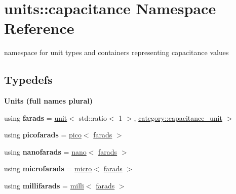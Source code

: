 \hypertarget{namespaceunits_1_1capacitance}{}\section{units\+:\+:capacitance Namespace Reference}
\label{namespaceunits_1_1capacitance}


namespace for unit types and containers representing capacitance values  


\subsection*{Typedefs}
\begin{Indent}{\bf Units (full names plural)}\par
\begin{DoxyCompactItemize}
\item 
\hypertarget{namespaceunits_1_1capacitance_a5c527231d50a09911cca9e4797a642af}{}using {\bfseries farads} = \hyperlink{structunits_1_1unit}{unit}$<$ std\+::ratio$<$ 1 $>$, \hyperlink{namespaceunits_1_1category_a0485a4663b435d78582744b8b83ea3c2}{category\+::capacitance\+\_\+unit} $>$\label{namespaceunits_1_1capacitance_a5c527231d50a09911cca9e4797a642af}

\item 
\hypertarget{namespaceunits_1_1capacitance_aaeced7bfd0603e91e079bd052c66b455}{}using {\bfseries picofarads} = \hyperlink{group___unit_manipulators_ga82a8d14a3e0877a375a66b64c45baab9}{pico}$<$ \hyperlink{structunits_1_1unit}{farads} $>$\label{namespaceunits_1_1capacitance_aaeced7bfd0603e91e079bd052c66b455}

\item 
\hypertarget{namespaceunits_1_1capacitance_a481db0caa9cef79932f1ca251a6f610b}{}using {\bfseries nanofarads} = \hyperlink{group___unit_manipulators_ga1c25c3c1d6c1f3aed3fd1ecf043110d5}{nano}$<$ \hyperlink{structunits_1_1unit}{farads} $>$\label{namespaceunits_1_1capacitance_a481db0caa9cef79932f1ca251a6f610b}

\item 
\hypertarget{namespaceunits_1_1capacitance_ab72ef2d1eda78ca33fed7c11a528b303}{}using {\bfseries microfarads} = \hyperlink{group___unit_manipulators_gaea53c906ec805110b93f02db4a961971}{micro}$<$ \hyperlink{structunits_1_1unit}{farads} $>$\label{namespaceunits_1_1capacitance_ab72ef2d1eda78ca33fed7c11a528b303}

\item 
\hypertarget{namespaceunits_1_1capacitance_a582f5082f366472d7704f806e3caa367}{}using {\bfseries millifarads} = \hyperlink{group___unit_manipulators_gaec9d1c320e180eb59f3cb3094d8079dd}{milli}$<$ \hyperlink{structunits_1_1unit}{farads} $>$\label{namespaceunits_1_1capacitance_a582f5082f366472d7704f806e3caa367}


\end{DoxyCompactItemize}
\end{Indent}
